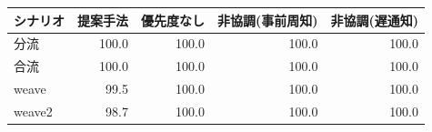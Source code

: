 \begin{tabular}{lrrrr}
\hline \hline
シナリオ & 提案手法 & 優先度なし & 非協調(事前周知) & 非協調(遅通知) \\
\hline
分流 & 100.0 & 100.0 & 100.0 & 100.0 \\
合流 & 100.0 & 100.0 & 100.0 & 100.0 \\
weave & 99.5 & 100.0 & 100.0 & 100.0 \\
weave2 & 98.7 & 100.0 & 100.0 & 100.0 \\
\hline
\end{tabular}
